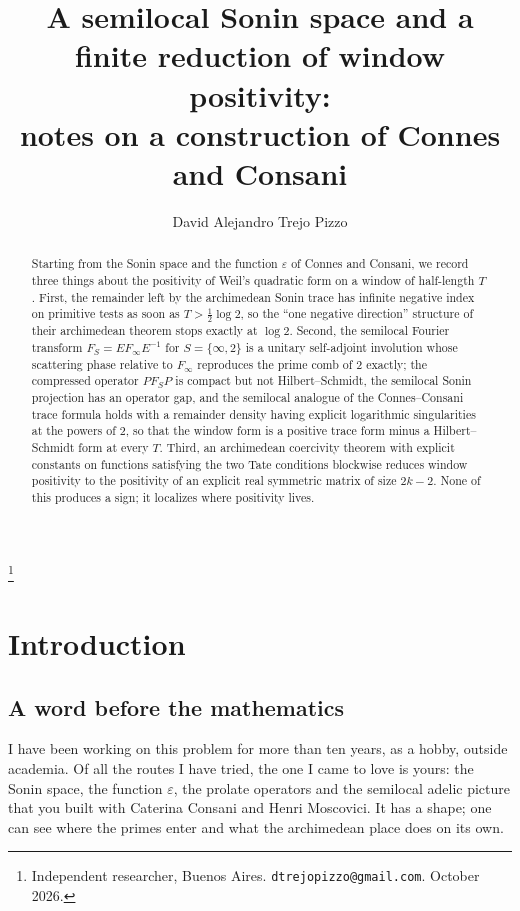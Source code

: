 \documentclass[11pt]{amsart}
\theoremstyle{definition}
\theoremstyle{remark}
\begin{document}
\title[A semilocal Sonin space and a finite reduction]{A semilocal Sonin space and a finite reduction of window positivity:\\ notes on a construction of Connes and Consani}
\author{David Alejandro Trejo Pizzo}
\thanks{Independent researcher, Buenos Aires. \texttt{dtrejopizzo@gmail.com}. October 2026.}
\date{}

\begin{abstract}
Starting from the Sonin space and the function $\varepsilon$ of Connes and Consani, we record three
things about the positivity of Weil's quadratic form on a window of half-length $T$. First, the
remainder left by the archimedean Sonin trace has infinite negative index on primitive tests as soon as
$T>\frac12\log2$, so the ``one negative direction'' structure of their archimedean theorem stops exactly
at $\log2$. Second, the semilocal Fourier transform $F_S=EF_\infty E^{-1}$ for $S=\{\infty,2\}$ is a
unitary self-adjoint involution whose scattering phase relative to $F_\infty$ reproduces the prime comb
of $2$ exactly; the compressed operator $PF_SP$ is compact but not Hilbert--Schmidt, the semilocal Sonin
projection has an operator gap, and the semilocal analogue of the Connes--Consani trace formula holds with
a remainder density having explicit logarithmic singularities at the powers of $2$, so that the window
form is a positive trace form minus a Hilbert--Schmidt form at every $T$. Third, an archimedean coercivity
theorem with explicit constants on functions satisfying the two Tate conditions blockwise reduces window
positivity to the positivity of an explicit real symmetric matrix of size $2k-2$. None of this produces a
sign; it localizes where positivity lives.
\end{abstract}

\maketitle

\section{Introduction}

\subsection*{A word before the mathematics}
I have been working on this problem for more than ten years, as a hobby, outside academia. Of all the
routes I have tried, the one I came to love is yours: the Sonin space, the function $\varepsilon$, the
prolate operators and the semilocal adelic picture that you built with Caterina Consani and Henri
Moscovici. It has a shape; one can see where the primes enter and what the archimedean place does on its
own.
\end{document}
